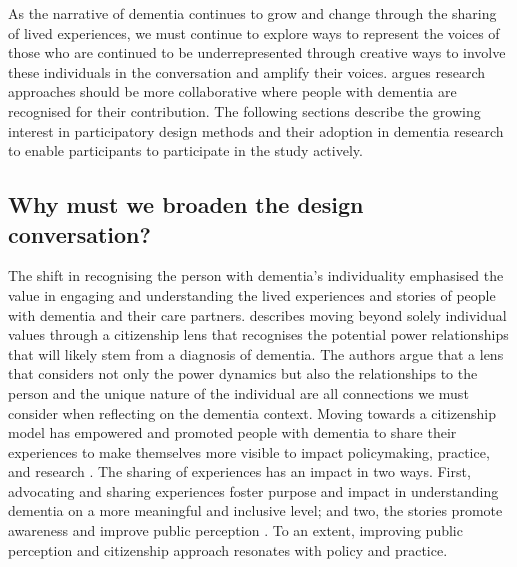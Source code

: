 As the narrative of dementia continues to grow and change through the sharing of lived experiences, we must continue to explore ways to represent the voices of those who are continued to be underrepresented through creative ways to involve these individuals in the conversation and amplify their voices. \cite{swarbrick2015quest} argues research approaches should be more collaborative where people with dementia are recognised for their contribution. The following sections describe the growing interest in participatory design methods and their adoption in dementia research to enable participants to participate in the study actively. 

\subsection{Why must we broaden the design conversation?}
\label{Design-conversation}
The shift in recognising the person with dementia's individuality emphasised the value in engaging and understanding the lived experiences and stories of people with dementia and their care partners. \cite{bartlett_personhood_2007} describes moving beyond solely individual values through a citizenship lens that recognises the potential power relationships that will likely stem from a diagnosis of dementia. The authors argue that a lens that considers not only the power dynamics but also the relationships to the person and the unique nature of the individual are all connections we must consider when reflecting on the dementia context. Moving towards a citizenship model has empowered and promoted people with dementia to share their experiences to make themselves more visible to impact policymaking, practice, and research \citep{weetch_involvement_2020}. The sharing of experiences has an impact in two ways. First, advocating and sharing experiences foster purpose and impact in understanding dementia on a more meaningful and inclusive level; and two, the stories promote awareness and improve public perception \citep{reynolds2017stigma}. To an extent, improving public perception and citizenship approach resonates with policy and practice. 

